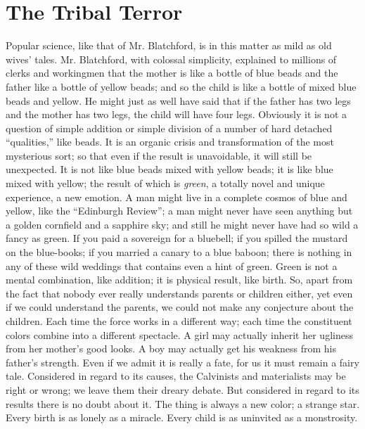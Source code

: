 \documentclass{book}
\begin{document}
\chapter{The Tribal Terror}
\label{chapter-33}
Popular science, like that of Mr. Blatchford, is in this matter as mild as old wives’ tales. Mr. Blatchford, with colossal simplicity, explained to millions of clerks and workingmen that the mother is like a bottle of blue beads and the father like a bottle of yellow beads; and so the child is like a bottle of mixed blue beads and yellow. He might just as well have said that if the father has two legs and the mother has two legs, the child will have four legs. Obviously it is not a question of simple addition or simple division of a number of hard detached “qualities,” like beads. It is an organic crisis and transformation of the most mysterious sort; so that even if the result is unavoidable, it will still be unexpected. It is not like blue beads mixed with yellow beads; it is like blue mixed with yellow; the result of which is \emph{green}, a totally novel and unique experience, a new emotion. A man might live in a complete cosmos of blue and yellow, like the “Edinburgh Review”; a man might never have seen anything but a golden cornfield and a sapphire sky; and still he might never have had so wild a fancy as green. If you paid a sovereign for a bluebell; if you spilled the mustard on the blue-books; if you married a canary to a blue baboon; there is nothing in any of these wild weddings that contains even a hint of green. Green is not a mental combination, like addition; it is physical result, like birth. So, apart from the fact that nobody ever really understands parents or children either, yet even if we could understand the parents, we could not make any conjecture about the children. Each time the force works in a different way; each time the constituent colors combine into a different spectacle. A girl may actually inherit her ugliness from her mother’s good looks. A boy may actually get his weakness from his father’s strength. Even if we admit it is really a fate, for us it must remain a fairy tale. Considered in regard to its causes, the Calvinists and materialists may be right or wrong; we leave them their dreary debate. But considered in regard to its results there is no doubt about it. The thing is always a new color; a strange star. Every birth is as lonely as a miracle. Every child is as uninvited as a monstrosity.
\end{document}
